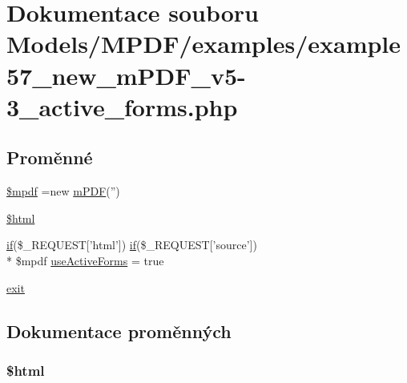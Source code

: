 \hypertarget{example57__new__m_p_d_f__v5-3__active__forms_8php}{\section{Dokumentace souboru Models/\-M\-P\-D\-F/examples/example57\-\_\-new\-\_\-m\-P\-D\-F\-\_\-v5-\/3\-\_\-active\-\_\-forms.php}
\label{example57__new__m_p_d_f__v5-3__active__forms_8php}
}
\subsection*{Proměnné}
\begin{DoxyCompactItemize}
\item 
\hyperlink{example57__new__m_p_d_f__v5-3__active__forms_8php_ad028f81910d6cbab9b184d2214b3a8f8}{\$mpdf} =new \hyperlink{classm_p_d_f}{m\-P\-D\-F}('')
\item 
\hyperlink{example57__new__m_p_d_f__v5-3__active__forms_8php_a6f96e7fc92441776c9d1cd3386663b40}{\$html}
\item 
\hyperlink{pdf__parser_8php_af8105e84b42a9ceda5357caeb6c4760b}{if}(\$\-\_\-\-R\-E\-Q\-U\-E\-S\-T\mbox{[}'html'\mbox{]}) \hyperlink{pdf__parser_8php_af8105e84b42a9ceda5357caeb6c4760b}{if}(\$\-\_\-\-R\-E\-Q\-U\-E\-S\-T\mbox{[}'source'\mbox{]}) \\*
\$mpdf \hyperlink{example57__new__m_p_d_f__v5-3__active__forms_8php_a378161bd0fa26b3dc46a75ac7aa2671b}{use\-Active\-Forms} = true
\item 
\hyperlink{example57__new__m_p_d_f__v5-3__active__forms_8php_a6733eb5f605d09eaede9845835d71c4e}{exit}
\end{DoxyCompactItemize}


\subsection{Dokumentace proměnných}
\hypertarget{example57__new__m_p_d_f__v5-3__active__forms_8php_a6f96e7fc92441776c9d1cd3386663b40}{
\subsubsection[{\$html}]{\setlength{\rightskip}{0pt plus 5cm}\$html}}\label{example57__new__m_p_d_f__v5-3__active__forms_8php_a6f96e7fc92441776c9d1cd3386663b40}


